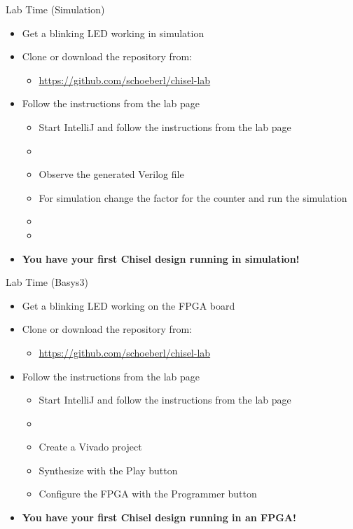 \begin{frame}[fragile]{Lab Time (Simulation)}
\begin{itemize}
\item Get a blinking LED working in simulation
\item Clone or download the repository from:
\begin{itemize}
\item \url{https://github.com/schoeberl/chisel-lab}
\end{itemize}
\item Follow the instructions from the lab page
\begin{itemize}
\item Start IntelliJ and follow the instructions from the lab page
\item {}
\item Observe the generated Verilog file
\item For simulation change the factor for the counter and run the simulation
\item {}
\item {}
\end{itemize}
\item {\bf You have your first Chisel design running in simulation!}
\end{itemize}
\end{frame}

\begin{frame}[fragile]{Lab Time (Basys3)}
\begin{itemize}
\item Get a blinking LED working on the FPGA board
\item Clone or download the repository from:
\begin{itemize}
\item \url{https://github.com/schoeberl/chisel-lab}
\end{itemize}
\item Follow the instructions from the lab page
\begin{itemize}
\item Start IntelliJ and follow the instructions from the lab page
\item {}
\item Create a Vivado project
\item Synthesize with the Play button
\item Configure the FPGA with the Programmer button
\end{itemize}
\item {\bf You have your first Chisel design running in an FPGA!}
\end{itemize}
\end{frame}

